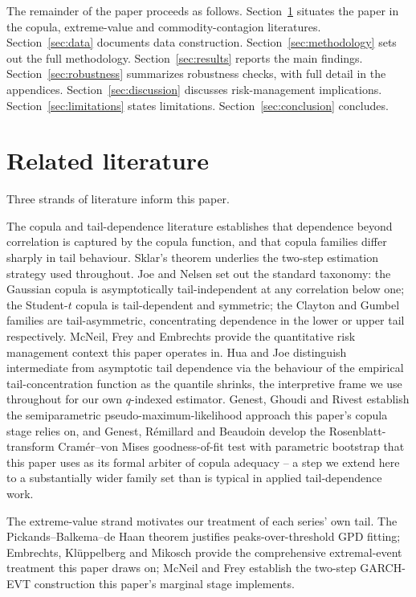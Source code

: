 \documentclass[final,3p,times,authoryear]{elsarticle}
\begin{document}
The remainder of the paper proceeds as follows. Section~\ref{sec:lit}
situates the paper in the copula, extreme-value and commodity-contagion
literatures. Section~\ref{sec:data} documents data construction.
Section~\ref{sec:methodology} sets out the full methodology.
Section~\ref{sec:results} reports the main findings.
Section~\ref{sec:robustness} summarizes robustness checks, with full
detail in the appendices. Section~\ref{sec:discussion} discusses
risk-management implications. Section~\ref{sec:limitations} states
limitations. Section~\ref{sec:conclusion} concludes.

\section{Related literature}
\label{sec:lit}

Three strands of literature inform this paper.

The copula and tail-dependence literature establishes that dependence
beyond correlation is captured by the copula function, and that copula
families differ sharply in tail behaviour. Sklar's theorem
\citep{sklar1959} underlies the two-step estimation strategy used
throughout. Joe \citep{joe1997} and Nelsen \citep{nelsen2006} set out
the standard taxonomy: the Gaussian copula is asymptotically
tail-independent at any correlation below one; the Student-$t$ copula is
tail-dependent and symmetric; the Clayton and Gumbel families are
tail-asymmetric, concentrating dependence in the lower or upper tail
respectively. McNeil, Frey and Embrechts \citep{mcneil2015} provide the
quantitative risk management context this paper operates in. Hua and
Joe \citep{hua2011} distinguish intermediate from asymptotic tail
dependence via the behaviour of the empirical tail-concentration
function as the quantile shrinks, the interpretive frame we use
throughout for our own $q$-indexed estimator. Genest, Ghoudi and Rivest
\citep{genest1995} establish the semiparametric pseudo-maximum-likelihood
approach this paper's copula stage relies on, and Genest, R\'emillard
and Beaudoin \citep{genest2009} develop the Rosenblatt-transform
Cram\'er--von Mises goodness-of-fit test with parametric bootstrap that
this paper uses as its formal arbiter of copula adequacy -- a step we
extend here to a substantially wider family set than is typical in
applied tail-dependence work.

The extreme-value strand motivates our treatment of each series' own
tail. The Pickands--Balkema--de Haan theorem \citep{balkema1974,pickands1975}
justifies peaks-over-threshold GPD fitting; Embrechts, Kl\"uppelberg and
Mikosch \citep{embrechts1997} provide the comprehensive extremal-event
treatment this paper draws on; McNeil and Frey \citep{mcneil2000}
establish the two-step GARCH-EVT construction this paper's marginal
stage implements.
\end{document}
